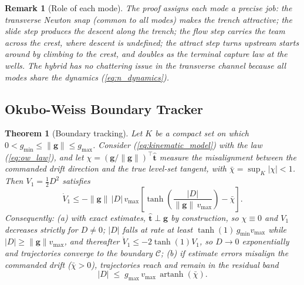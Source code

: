 \documentclass[lettersize,journal]{IEEEtran}
\newtheorem{theorem}{Theorem}
\newtheorem{remark}{Remark}
\begin{document}
\begin{remark}[Role of each mode]
The proof assigns each mode a precise job: the transverse Newton snap
(common to all modes) makes the trench attractive; the slide step produces the
descent along the trench; the flow step carries the team across the crest, where
descent is undefined; the attract step turns upstream starts around by climbing to
the crest, and doubles as the terminal capture law at the wells. The
hybrid has no chattering issue in the transverse channel because all
modes share the dynamics (\ref{eq:n_dynamics}).
\end{remark}

\subsection{Okubo-Weiss Boundary Tracker}
\label{sec:stab_ow}

\begin{theorem}[Boundary tracking]
\label{thm:ow}
Let $K$ be a compact set on which $0 < g_{\min} \leq \|\mathbf{g}\| \leq
g_{\max}$. Consider (\ref{eq:kinematic_model}) with the law
(\ref{eq:ow_law}), and let $\chi = (\mathbf{g}/\|\mathbf{g}\|)^\top
\hat{\mathbf{t}}$ measure the misalignment between the commanded drift
direction and the true level-set tangent, with $\bar{\chi} = \sup_K
|\chi| < 1$. Then $V_1 = \tfrac{1}{2}D^2$ satisfies
\begin{equation}
    \dot{V}_1 \leq -\|\mathbf{g}\|\,|D|\,v_{\max}\left[
    \tanh\!\left(\frac{|D|}{\|\mathbf{g}\|\,v_{\max}}\right)
    - \bar{\chi}\right].
    \label{eq:V1_dot}
\end{equation}
Consequently:
(a) with exact estimates, $\hat{\mathbf{t}} \perp \mathbf{g}$ by
construction, so $\chi \equiv 0$ and $V_1$ decreases strictly for
$D \neq 0$; $|D|$ falls at rate at least $\tanh(1)\,g_{\min} v_{\max}$
while $|D| \geq \|\mathbf{g}\| v_{\max}$, and thereafter $\dot{V}_1
\leq -2\tanh(1)V_1$, so $D \to 0$ exponentially and trajectories
converge to the boundary $\mathcal{C}$;
(b) if estimate errors misalign the commanded drift ($\bar{\chi} > 0$),
trajectories reach and remain in the residual band
\begin{equation}
    |D| \;\leq\; g_{\max}\, v_{\max}\,
    \operatorname{artanh}(\bar{\chi}).
    \label{eq:ow_residual}
\end{equation}
\end{theorem}
\end{document}

